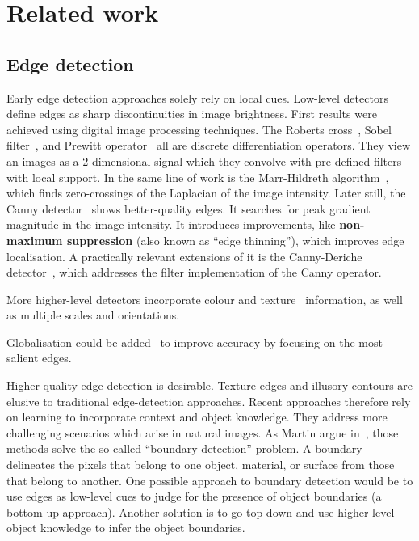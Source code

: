\section{Related work}
\subsection{Edge detection}
Early edge detection approaches solely rely on local cues. Low-level detectors define edges as sharp discontinuities in image brightness. First results were achieved using digital image processing techniques. The Roberts cross~\cite{roberts1963machine}, Sobel filter~\cite{sobel19683x3}, and Prewitt operator~\cite{prewitt1970object} all are discrete differentiation operators. %
They view an images as a 2-dimensional signal which they convolve with pre-defined filters with local support. In the same line of work is the Marr-Hildreth algorithm~\cite{marr1980theory}, which finds zero-crossings of the Laplacian of the image intensity. Later still, the Canny detector~\cite{canny1986computational} shows better-quality edges. It searches for peak gradient magnitude in the image intensity. It introduces %
improvements, like {\bf non-maximum suppression} (also known as ``edge thinning''), which improves edge localisation. A practically relevant extensions of it is the Canny-Deriche detector~\cite{deriche1987using}, which addresses the filter implementation of the Canny operator.

More higher-level detectors incorporate colour and texture~\cite{rubner1996coalescing,will2000learning} information, as well as multiple scales and orientations.

Globalisation could be added~\cite{Arbelaez11,Xiaofeng2012discriminatively} to improve accuracy by focusing on the most salient edges.

Higher quality edge detection is desirable. Texture edges and illusory contours are elusive to %
traditional edge-detection approaches. Recent approaches therefore rely on learning to incorporate context and object knowledge. They address more challenging scenarios which arise in natural images. As Martin \etal argue in~\cite{martin2004learning}, those methods solve the so-called ``boundary detection'' problem. A boundary delineates the pixels that belong to one object, material, or surface from those that belong to another. One possible approach to boundary detection would be to use edges as low-level cues to judge for the presence of object boundaries (a bottom-up approach). Another solution is to go top-down and use higher-level object knowledge to infer the object boundaries.

